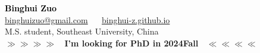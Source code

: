 \documentclass[margin, centered]{res}
\begin{document}
\begin{center}
    \hspace{-\hoffset}
    \vspace{3mm}
    \huge {\textcolor{black}{\textbf{Binghui Zuo}}}\\
    
    \hspace{-\hoffset}
    \large \href{mailto:binghuizuo@gmail.com}{binghuizuo@gmail.com} ~\textbullet~ \href{https://binghui-z.github.io/}{binghui-z.github.io} \\
    \hspace{-\hoffset}
    M.S. student, Southeast University, China \\
    \hspace{-\hoffset}
    \textcolor[rgb]{1,0,0}{\textbf{$\gg \gg \gg \gg$  ~I'm looking for PhD in 2024Fall~ $\ll \ll \ll \ll$}}
\end{center}
\end{document}

